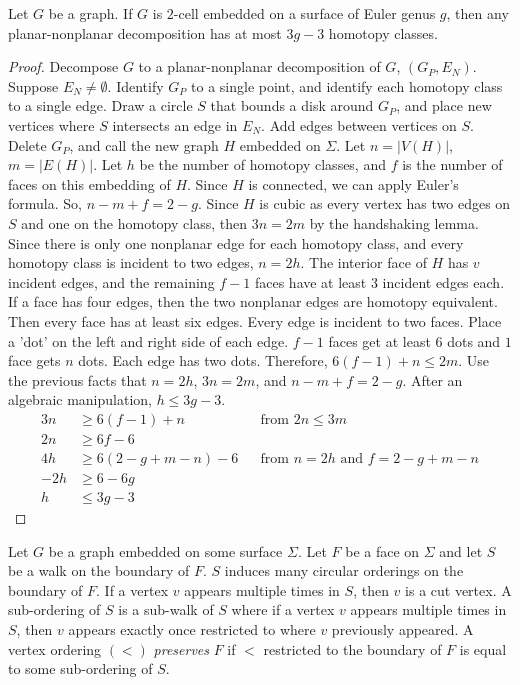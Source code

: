 \begin{lemma}
	Let $G$ be a graph. If \(G\) is \(2\)-cell embedded on a surface of Euler genus \(g\), then any planar-nonplanar decomposition has at most \(3g-3\) homotopy classes. 
\end{lemma}
\begin{proof}
	Decompose \(G\) to a planar-nonplanar decomposition of \(G\), \((G_P, E_N)\). Suppose \(E_N \neq \emptyset\). Identify \(G_P\) to a single point, and identify each homotopy class to a single edge. Draw a circle $S$ that bounds a disk around \(G_P\), and place new vertices where $S$ intersects an edge in $E_N$. Add edges between vertices on $S$. Delete \(G_P\), and call the new graph \(H\) embedded on $\Sigma$. Let \(n = |V(H)|\), \(m = |E(H)|\). Let \(h\) be the number of homotopy classes, and \(f\) is the number of faces on this embedding of $H$. Since $H$ is connected, we can apply Euler's formula. So, \(n - m + f = 2 - g\). Since \(H\) is cubic as every vertex has two edges on $S$ and one on the homotopy class, then \(3n = 2m\) by the handshaking lemma. Since there is only one nonplanar edge for each homotopy class, and every homotopy class is incident to two edges, \(n = 2h\). The interior face of \(H\) has \(v\) incident edges, and the remaining \(f-1\) faces have at least 3 incident edges each. If a face has four edges, then the two nonplanar edges are homotopy equivalent. Then every face has at least six edges. Every edge is incident to two faces. Place a 'dot' on the left and right side of each edge. $f-1$ faces get at least $6$ dots and $1$ face gets $n$ dots. Each edge has two dots. Therefore, \(  6(f-1) + n \leq 2m \). Use the previous facts that $n = 2h$, $3n = 2m$, and $n - m + f = 2 - g$. After an algebraic manipulation, \(h \leq 3g - 3 \). 
	\begin{align*}
		3n  & \geq 6(f - 1) + n         && \text{from } 2n \leq 3m \\
		2n  & \geq 6f - 6               \\
		4h  & \geq 6(2 - g + m - n) - 6 && \text{from } n = 2h \text{ and } f = 2 - g + m - n\\
		-2h & \geq 6 - 6g               \\
		h   & \leq 3g - 3
	\end{align*}
\end{proof}

Let \(G\) be a graph embedded on some surface $\Sigma$. Let $F$ be a face on $\Sigma$ and let $S$ be a walk on the boundary of $F$. $S$ induces many circular orderings on the boundary of $F$. If a vertex $v$ appears multiple times in $S$, then $v$ is a cut vertex. A sub-ordering of $S$ is a sub-walk of $S$ where if a vertex $v$ appears multiple times in $S$, then $v$ appears exactly once restricted to where $v$ previously appeared. A vertex ordering \((<)\) \textit{preserves} \(F\) if $<$ restricted to the boundary of $F$ is equal to some sub-ordering of $S$.

